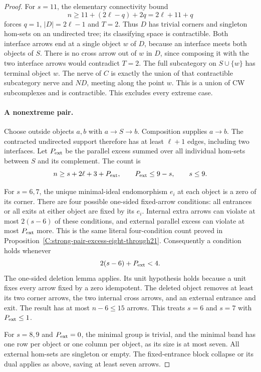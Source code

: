 \begin{proof}
For $s=11$, the elementary connectivity bound
\[
 n\geq11+(2\ell-q)+2q=2\ell+11+q
\]
forces $q=1$, $|D|=2\ell-1$ and $T=2$.
Thus $D$ has trivial corners and singleton hom-sets on an
undirected tree; its classifying space is contractible.
Both interface arrows end at a single object $w$ of $D$,
because an interface meets both objects of $S$. There is no
cross arrow out of $w$ in $D$, since composing it with the two
interface arrows would contradict $T=2$. The full subcategory
on $S\cup\{w\}$ has terminal object $w$.
The nerve of $C$ is exactly the union of that contractible
subcategory nerve and $ND$, meeting along the point $w$.
This is a union of CW subcomplexes and is contractible.
This excludes every extreme case.

\paragraph{A nonextreme pair.}
Choose outside objects $a,b$ with $a\to S\to b$.
Composition supplies $a\to b$. The contracted undirected
support therefore has at least $\ell+1$ edges, including two
interfaces. Let $P_{\rm ext}$ be the parallel excess summed
over all individual hom-sets between $S$ and its complement.
The count is
\[
 n\geq s+2\ell+3+P_{\rm ext},\qquad
 P_{\rm ext}\leq9-s,\qquad s\leq9.
\]

For $s=6,7$, the unique minimal-ideal endomorphism $e_i$ at
each object is a zero of its corner. There are four possible
one-sided fixed-arrow conditions: all entrances or all exits
at either object are fixed by its $e_i$. Internal extra arrows
can violate at most $2(s-6)$ of these conditions, and external
parallel excess can violate at most $P_{\rm ext}$ more.
This is the same literal four-condition count proved in
Proposition~\ref{C:strong-pair-excess-eight-through21}.
Consequently a condition holds whenever
\[
 2(s-6)+P_{\rm ext}<4.
\]
The one-sided deletion lemma applies. Its unit hypothesis holds
because a unit fixes every arrow fixed by a zero idempotent.
The deleted object removes at least its two corner arrows,
the two internal cross arrows, and an external entrance and
exit. The result has at most $n-6\leq15$ arrows.
This treats $s=6$ and $s=7$ with $P_{\rm ext}\leq1$.

For $s=8,9$ and $P_{\rm ext}=0$, the minimal group is trivial,
and the minimal band has one row per object or one column per
object, as its size is at most seven. All external hom-sets
are singleton or empty. The fixed-entrance block collapse or
its dual applies as above, saving at least seven arrows.


\end{proof}
